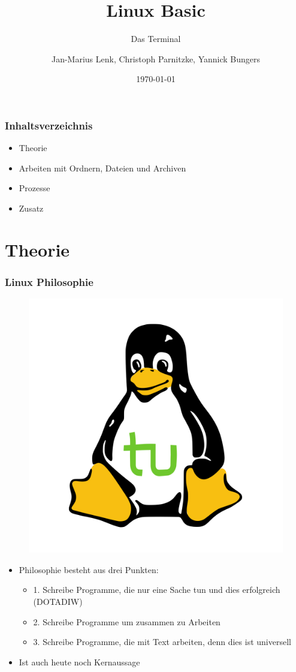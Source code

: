 \documentclass[12pt,utf8, handout]{beamer}
\title{Linux Basic}
\subtitle{Das Terminal}
\author[J.-M. Lenk, C. Parnitzke, Y. Bungers]{Jan-Marius Lenk, Christoph Parnitzke, Yannick Bungers}
\institute[FOSS AG]{Free and Open Source Software AG\\ Fakultät für Informatik}
\date{\today}
\begin{document}
\titlepage

\begin{frame}
\frametitle{Inhaltsverzeichnis}
\begin{itemize}
	\item Theorie
	\item Arbeiten mit Ordnern, Dateien und Archiven
	\item Prozesse
	\item Zusatz
\end{itemize}
\end{frame}

\section{Theorie}
\begin{frame}
\frametitle{Linux Philosophie}
\begin{figure}
\includegraphics[scale=0.15]{res/tuX_tu.png}
\end{figure}
\begin{itemize}
	\item Philosophie besteht aus drei Punkten:
	\begin{itemize}
		\item 1. Schreibe Programme, die nur eine Sache tun und dies erfolgreich (DOTADIW)
		\item 2. Schreibe Programme um zusammen zu Arbeiten
		\item 3. Schreibe Programme, die mit Text arbeiten, denn dies ist universell
	\end{itemize}
	\item Ist auch heute noch Kernaussage
\end{itemize}
\end{frame}
\end{document}
